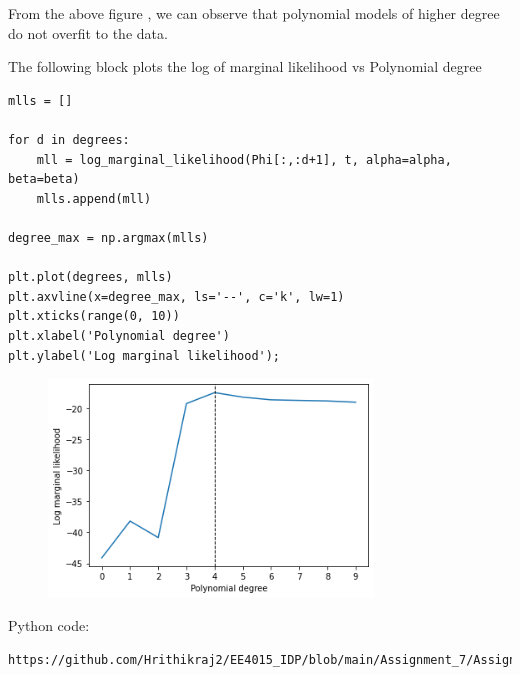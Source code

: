 \documentclass[journal,12pt,twocolumn]{IEEEtran}
\begin{document}
From the above figure , we can observe that polynomial models of higher degree do not overfit to the data.

The following block plots the log of marginal likelihood vs Polynomial degree
\begin{lstlisting}
mlls = []

for d in degrees:
    mll = log_marginal_likelihood(Phi[:,:d+1], t, alpha=alpha, beta=beta)
    mlls.append(mll)

degree_max = np.argmax(mlls)
    
plt.plot(degrees, mlls)
plt.axvline(x=degree_max, ls='--', c='k', lw=1)
plt.xticks(range(0, 10))
plt.xlabel('Polynomial degree')
plt.ylabel('Log marginal likelihood');
\end{lstlisting}

\begin{figure}[!h]
\begin{center}
\includegraphics[width=3.4in]{figs/fig2.png}
\end{center}
\caption{}
\label{fig:2}
\end{figure}

Python code:
\begin{lstlisting}
https://github.com/Hrithikraj2/EE4015_IDP/blob/main/Assignment_7/Assignment_7.ipynb
\end{lstlisting}
\end{document}
